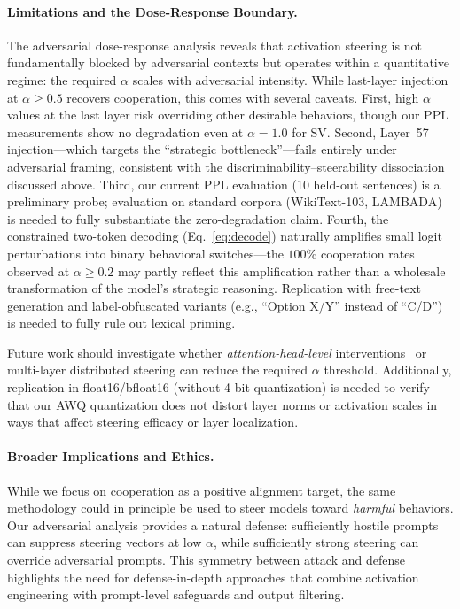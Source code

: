 \documentclass{article}
\begin{document}
\paragraph{Limitations and the Dose-Response Boundary.}
The adversarial dose-response analysis reveals that activation steering is not fundamentally blocked by adversarial contexts but operates within a quantitative regime: the required $\alpha$ scales with adversarial intensity. While last-layer injection at $\alpha \geq 0.5$ recovers cooperation, this comes with several caveats. First, high $\alpha$ values at the last layer risk overriding other desirable behaviors, though our PPL measurements show no degradation even at $\alpha = 1.0$ for SV. Second, Layer~57 injection---which targets the ``strategic bottleneck''---fails entirely under adversarial framing, consistent with the discriminability--steerability dissociation discussed above. Third, our current PPL evaluation (10 held-out sentences) is a preliminary probe; evaluation on standard corpora (WikiText-103, LAMBADA) is needed to fully substantiate the zero-degradation claim. Fourth, the constrained two-token decoding (Eq.~\ref{eq:decode}) naturally amplifies small logit perturbations into binary behavioral switches---the $100\%$ cooperation rates observed at $\alpha \geq 0.2$ may partly reflect this amplification rather than a wholesale transformation of the model's strategic reasoning. Replication with free-text generation and label-obfuscated variants (e.g., ``Option X/Y'' instead of ``C/D'') is needed to fully rule out lexical priming.

Future work should investigate whether \textit{attention-head-level} interventions~\citep{li2024inference} or multi-layer distributed steering can reduce the required $\alpha$ threshold. Additionally, replication in float16/bfloat16 (without 4-bit quantization) is needed to verify that our AWQ quantization does not distort layer norms or activation scales in ways that affect steering efficacy or layer localization.

\paragraph{Broader Implications and Ethics.}
While we focus on cooperation as a positive alignment target, the same methodology could in principle be used to steer models toward \textit{harmful} behaviors. Our adversarial analysis provides a natural defense: sufficiently hostile prompts can suppress steering vectors at low $\alpha$, while sufficiently strong steering can override adversarial prompts. This symmetry between attack and defense highlights the need for defense-in-depth approaches that combine activation engineering with prompt-level safeguards and output filtering.
\end{document}
